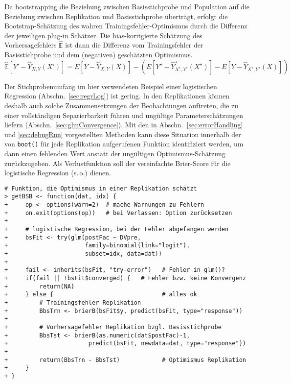 Da bootstrapping die Beziehung zwischen Basisstichprobe und Population auf die Beziehung zwischen Replikation und Basisstichprobe überträgt, erfolgt die Bootstrap-Schätzung des wahren Trainingsfehler-Optimismus durch die Differenz der jeweiligen plug-in Schätzer. Die bias-korrigierte Schätzung des Vorhersagefehlers $\hat{\mathbb{E}}$ ist dann die Differenz vom Trainingsfehler der Basisstichprobe und dem (negativen) geschätzten Optimismus.
\begin{equation*}
\hat{\mathbb{E}}[Y' - \hat{Y}_{X, Y}(X')] = \overline{E}[Y - \hat{Y}_{X, Y}(X)] - (\overline{E}[Y^{\star} - \hat{Y}^{\star}_{X^{\star}, Y^{\star}}(X^{\star})] - \overline{E}[Y - \hat{Y}_{X^{\star}, Y^{\star}}(X)])
\end{equation*}

Der Stichprobenumfang im hier verwendeten Beispiel einer logistischen Regression (Abschn.\ \ref{sec:regrLog}) ist gering. In den Replikationen können deshalb auch solche Zusammensetzungen der Beobachtungen auftreten, die zu einer vollständigen Separierbarkeit führen und ungültige Parameterschätzungen liefern (Abschn.\ \ref{sec:glmConvergence}). Mit den in Abschn.\ \ref{sec:errorHandling} und \ref{sec:debugRun} vorgestellten Methoden kann diese Situation innerhalb der von \lstinline!boot()! für jede Replikation aufgerufenen Funktion identifiziert werden, um dann einen fehlenden Wert anstatt der ungültigen Optimismus-Schätzung zurückzugeben. Als Verlustfunktion soll der vereinfachte Brier-Score für die logistische Regression (s.\,o.) dienen.
\begin{lstlisting}
# Funktion, die Optimismus in einer Replikation schätzt
> getBSB <- function(dat, idx) {
+     op <- options(warn=2)  # mache Warnungen zu Fehlern
+     on.exit(options(op))   # bei Verlassen: Option zurücksetzen
+
+     # logistische Regression, bei der Fehler abgefangen werden
+     bsFit <- try(glm(postFac ~ DVpre,
+                      family=binomial(link="logit"),
+                      subset=idx, data=dat))
+
+     fail <- inherits(bsFit, "try-error")   # Fehler in glm()?
+     if(fail || !bsFit$converged) {   # Fehler bzw. keine Konvergenz
+         return(NA)
+     } else {                               # alles ok
+         # Trainingsfehler Replikation
+         BbsTrn <- brierB(bsFit$y, predict(bsFit, type="response"))
+
+         # Vorhersagefehler Replikation bzgl. Basisstichprobe
+         BbsTst <- brierB(as.numeric(dat$postFac)-1,
+                       predict(bsFit, newdata=dat, type="response"))
+
+         return(BbsTrn - BbsTst)            # Optimismus Replikation
+     }
+ }
\end{lstlisting}

